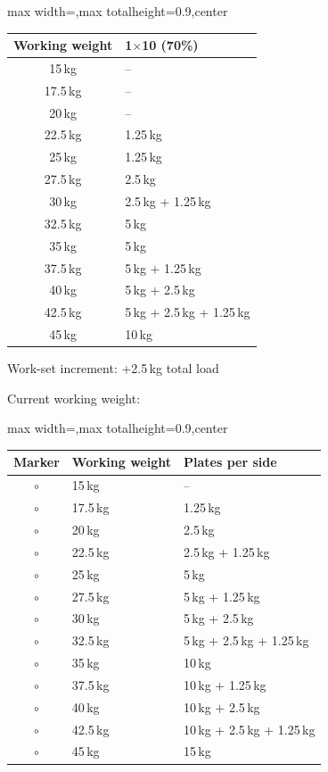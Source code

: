\documentclass[11pt,a4paper]{article}
\newcommand{\tablearraystretch}{1.15}
\begin{document}
\begin{center}
\renewcommand{\arraystretch}{\tablearraystretch}
\begin{adjustbox}{max width=\linewidth,max totalheight=0.9\textheight,center}
\begin{tabular}{c p{5.5cm}}
\toprule
Working weight & 1$\times$10 (70\%) \\
\midrule
15\,kg   & -- \\
17.5\,kg & -- \\
20\,kg   & -- \\
22.5\,kg & 1.25\,kg \\
25\,kg   & 1.25\,kg \\
27.5\,kg & 2.5\,kg \\
30\,kg   & 2.5\,kg + 1.25\,kg \\
32.5\,kg & 5\,kg \\
35\,kg   & 5\,kg \\
37.5\,kg & 5\,kg + 1.25\,kg \\
40\,kg   & 5\,kg + 2.5\,kg \\
42.5\,kg & 5\,kg + 2.5\,kg + 1.25\,kg \\
45\,kg   & 10\,kg \\
\bottomrule
\end{tabular}
\end{adjustbox}
\renewcommand{\arraystretch}{1}
\end{center}

Work-set increment: +2.5\,kg total load

Current working weight:

\begin{center}
\renewcommand{\arraystretch}{\tablearraystretch}
\begin{adjustbox}{max width=\linewidth,max totalheight=0.9\textheight,center}
\begin{tabular}{cll}
\toprule
Marker & Working weight & Plates per side \\
\midrule
$\circ$ & 15\,kg & -- \\
$\circ$ & 17.5\,kg & 1.25\,kg \\
$\circ$ & 20\,kg & 2.5\,kg \\
$\circ$ & 22.5\,kg & 2.5\,kg + 1.25\,kg \\
$\circ$ & 25\,kg & 5\,kg \\
$\circ$ & 27.5\,kg & 5\,kg + 1.25\,kg \\
$\circ$ & 30\,kg & 5\,kg + 2.5\,kg \\
$\circ$ & 32.5\,kg & 5\,kg + 2.5\,kg + 1.25\,kg \\
$\circ$ & 35\,kg & 10\,kg \\
$\circ$ & 37.5\,kg & 10\,kg + 1.25\,kg \\
$\circ$ & 40\,kg & 10\,kg + 2.5\,kg \\
$\circ$ & 42.5\,kg & 10\,kg + 2.5\,kg + 1.25\,kg \\
$\circ$ & 45\,kg & 15\,kg \\
\bottomrule
\end{tabular}
\end{adjustbox}
\renewcommand{\arraystretch}{1}
\end{center}
\end{document}
